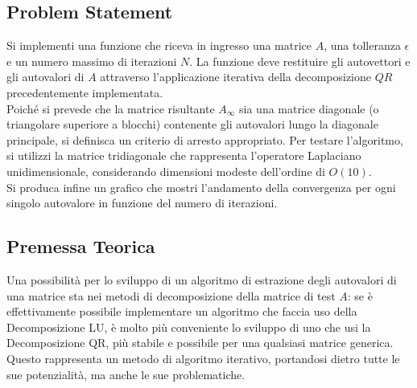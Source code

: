 \documentclass[11pt, a4paper]{article}
\begin{document}
\subsection{Problem Statement}
Si implementi una funzione che riceva in ingresso una matrice $A$, una tolleranza $\epsilon$ e un numero massimo di iterazioni $N$. La funzione deve restituire gli autovettori e gli autovalori di $A$ attraverso l'applicazione iterativa della decomposizione $QR$ precedentemente implementata.\\
Poiché si prevede che la matrice risultante $A_\infty$ sia una matrice diagonale (o triangolare superiore a blocchi) contenente gli autovalori lungo la diagonale principale, si definisca un criterio di arresto appropriato. Per testare l'algoritmo, si utilizzi la matrice tridiagonale che rappresenta l'operatore Laplaciano unidimensionale, considerando dimensioni modeste dell'ordine di $O(10)$.\\
Si produca infine un grafico che mostri l'andamento della convergenza per ogni singolo autovalore in funzione del numero di iterazioni.

\subsection{Premessa Teorica}
Una possibilità per lo sviluppo di un algoritmo di estrazione degli autovalori di una matrice sta nei metodi di decomposizione della matrice di test $A$: se è effettivamente possibile implementare un algoritmo che faccia uso della Decomposizione LU, è molto più conveniente lo sviluppo di uno che usi la Decomposizione QR, più stabile e possibile per una qualsiasi matrice generica. Questo rappresenta un metodo di algoritmo iterativo, portandosi dietro tutte le sue potenzialità, ma anche le sue problematiche.
\end{document}
